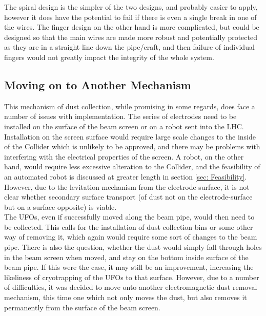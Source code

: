 \documentclass[../main.tex]{subfiles}
\begin{document}
The spiral design is the simpler of the two designs, and probably easier to apply, however it does have the potential to fail if there is even a single break in one of the wires.
The finger design on the other hand is more complicated, but could be designed so that the main wires are made more robust and potentially protected as they are in a straight line down the pipe/craft, and then failure of individual fingers would not greatly impact the integrity of the whole system.

\subsection{Moving on to Another Mechanism}
This mechanism of dust collection, while promising in some regards, does face a number of issues with implementation.
The series of electrodes need to be installed on the surface of the beam screen or on a robot sent into the LHC.
Installation on the screen surface would require large scale changes to the  inside of the Collider which is unlikely to be approved, and there may be problems with interfering with the electrical properties of the screen.
A robot, on the other hand, would require less excessive alteration to the Collider, and the feasibility of an automated robot is discussed at greater length in section \ref{sec: Feasibility}.
However, due to the levitation mechanism from the electrode-surface, it is not clear whether secondary surface transport (of dust not on the electrode-surface but on a surface opposite) is viable.\\

The UFOs, even if successfully moved along the beam pipe, would then need to be collected.
This calls for the installation of dust collection bins or some other way of removing it, which again would require some sort of changes to the beam pipe.
There is also the question, whether the dust would simply fall through holes in the beam screen when moved, and stay on the bottom inside surface of the beam pipe.
If this were the case, it may still be an improvement, increasing the likeliness of cryotrapping of the UFOs to that surface.
However, due to a number of difficulties, it was decided to move onto another electromagnetic dust removal mechanism, this time one which not only moves the dust, but also removes it permanently from the surface of the beam screen.

	
\end{document}
